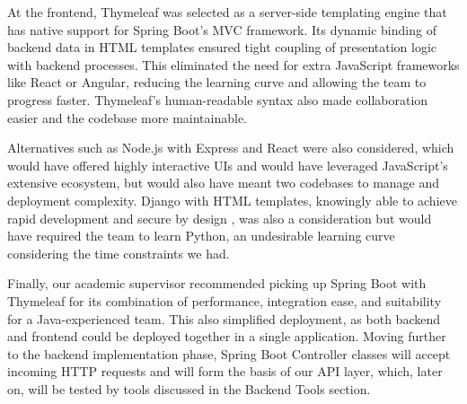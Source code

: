 At the frontend, Thymeleaf was selected as a server-side templating engine that has native support for Spring Boot's MVC framework. Its dynamic binding of backend data in HTML templates ensured tight coupling of presentation logic with backend processes. This eliminated the need for extra JavaScript frameworks like React or Angular, reducing the learning curve and allowing the team to progress faster. Thymeleaf's human-readable syntax also made collaboration easier and the codebase more maintainable.\cite{JavaGuides-Thymeleaf-ReactJS}

Alternatives such as Node.js with Express and React were also considered, which would have offered highly interactive UIs and would have leveraged JavaScript's extensive ecosystem, but would also have meant two codebases to manage and deployment complexity.\cite{Simplilearn-Nodejs-SB} Django with HTML templates, knowingly able to achieve rapid development and secure by design \cite{GFG-Djanggo-SB}, was also a consideration but would have required the team to learn Python, an undesirable learning curve considering the time constraints we had.

Finally, our academic supervisor recommended picking up Spring Boot with Thymeleaf for its combination of performance, integration ease, and suitability for a Java-experienced team. This also simplified deployment, as both backend and frontend could be deployed together in a single application. Moving further to the backend implementation phase, Spring Boot Controller classes will accept incoming HTTP requests and will form the basis of our API layer, which, later on, will be tested by tools discussed in the Backend Tools section.
